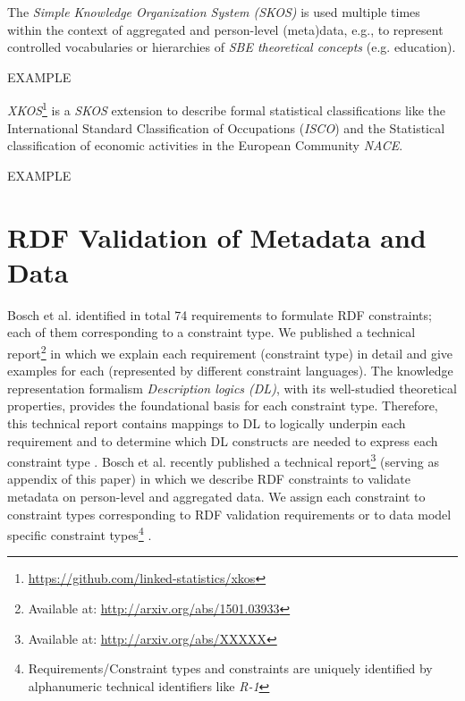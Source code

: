 \documentclass{llncs}
\newcommand{\tb}[1]{\todo[size=\small, color=green!40]{\textbf{Thomas:} #1}}
\begin{document}
The \emph{Simple Knowledge Organization System (SKOS)} is used multiple times within the context of aggregated and person-level (meta)data, e.g., to represent controlled vocabularies or hierarchies of \emph{SBE theoretical concepts} (e.g. education).

\begin{ex}
EXAMPLE
\end{ex}

\emph{XKOS}\footnote{\url{https://github.com/linked-statistics/xkos}} is a \emph{SKOS} extension to describe formal statistical classifications like the International Standard Classification of Occupations (\emph{ISCO}) and the Statistical classification of economic activities in the European Community \emph{NACE}.

\begin{ex}
EXAMPLE
\end{ex}

\section{RDF Validation of Metadata and Data}
\label{rdf-validation}

Bosch et al. identified in total 74 requirements to formulate RDF constraints; each of them corresponding to a constraint type. 
We published a technical report\footnote{Available at: \url{http://arxiv.org/abs/1501.03933}} in which we explain each requirement (constraint type) in detail and give examples for each (represented by different constraint languages).
The knowledge representation formalism \emph{Description logics (DL)}, with its  well-studied theoretical properties, provides the foundational basis for each constraint type.
Therefore, this technical report contains mappings to DL to logically underpin each requirement and to determine which DL constructs are needed to express each constraint type \cite{BoschNolleAcarEckert2015}.
Bosch et al. recently published a technical report\footnote{Available at: \url{http://arxiv.org/abs/XXXXX}} (serving as appendix of this paper) in which we describe RDF constraints to validate metadata on person-level and aggregated data.
We assign each constraint to constraint types corresponding to RDF validation requirements or to data model specific constraint types\footnote{Requirements/Constraint types and constraints are uniquely identified by alphanumeric technical identifiers like \emph{R-1}}
\cite{BoschZapilkoWackerowEckert2015}\tb{ToDo: publish technical report}.
\end{document}
